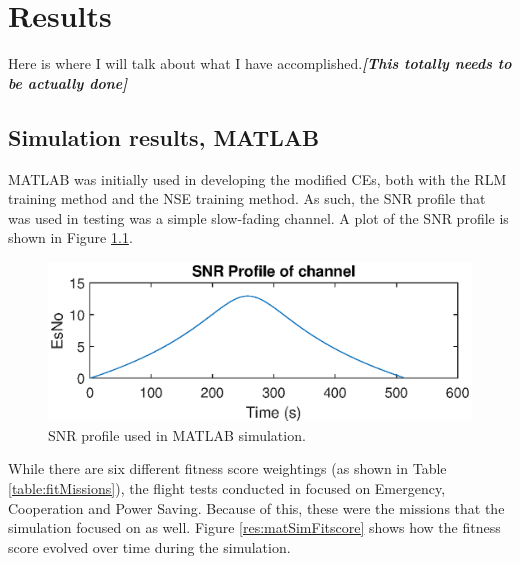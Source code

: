 \chapter{Results}\label{ch:results}

\par Here is where I will talk about what I have accomplished.\textbf{\textit{[This totally needs to be actually done]}}
\section{Simulation results, MATLAB}
\par MATLAB was initially used in developing the modified CEs, both with the RLM training method and the NSE training method. As such, the SNR profile that was used in testing was a simple slow-fading channel. A plot of the SNR profile is shown in Figure \ref{fig:matlabSNRProf}. 

\begin{figure}[ht]
\centering
\includegraphics[scale=1]{figures/matlab_sim_results/snrPRofile_matlabsim.eps}
\caption{SNR profile used in MATLAB simulation.}
\label{fig:matlabSNRProf}
\end{figure}

\par While there are six different fitness score weightings (as shown in Table \ref{table:fitMissions}), the flight tests conducted in \cite{tim_implementation} focused on Emergency, Cooperation and Power Saving. Because of this, these were the missions that the simulation focused on as well. Figure \ref{res:matSimFitscore} shows how the fitness score evolved over time during the simulation.

